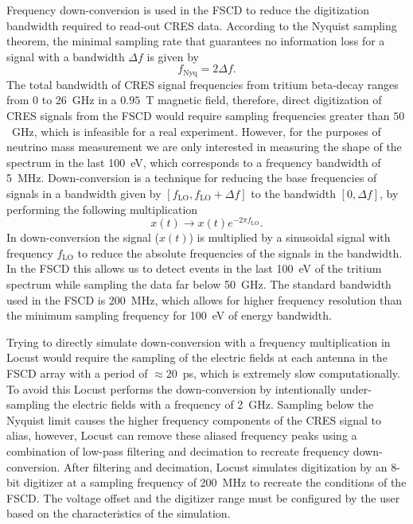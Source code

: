 Frequency down-conversion is used in the FSCD to reduce the digitization bandwidth required to read-out CRES data. According to the Nyquist sampling theorem, the minimal sampling rate that guarantees no information loss for a signal with a bandwidth $\Delta f$ is given by
\begin{equation}
    f_{\textrm{Nyq}}=2\Delta f.
\end{equation}
The total bandwidth of CRES signal frequencies from tritium beta-decay ranges from 0 to 26~GHz in a $0.95$~T magnetic field, therefore, direct digitization of CRES signals from the FSCD would require sampling frequencies greater than $50$~GHz, which is infeasible for a real experiment. However, for the purposes of neutrino mass measurement we are only interested in measuring the shape of the spectrum in the last 100~eV, which corresponds to a frequency bandwidth of 5~MHz. Down-conversion is a technique for reducing the base frequencies of signals in a bandwidth given by $[f_\textrm{LO},f_\textrm{LO}+\Delta f]$ to the bandwidth $[0, \Delta f]$, by performing the following multiplication
\begin{equation}
    x(t)\rightarrow x(t)e^{-2\pi f_\textrm{LO}}.
\end{equation}
In down-conversion the signal ($x(t)$) is multiplied by a sinusoidal signal with frequency $f_\textrm{LO}$ to reduce the absolute frequencies of the signals in the bandwidth. In the FSCD this allows us to detect events in the last 100~eV of the tritium spectrum while sampling the data far below 50~GHz. The standard bandwidth used in the FSCD is 200~MHz, which allows for higher frequency resolution than the minimum sampling frequency for 100~eV of energy bandwidth.

Trying to directly simulate down-conversion with a frequency multiplication in Locust would require the sampling of the electric fields at each antenna in the FSCD array with a period of $\approx20$~ps, which is extremely slow computationally. To avoid this Locust performs the down-conversion by intentionally under-sampling the electric fields with a frequency of 2~GHz. Sampling below the Nyquist limit causes the higher frequency components of the CRES signal to alias, however, Locust can remove these aliased frequency peaks using a combination of low-pass filtering and decimation to recreate frequency down-conversion. After filtering and decimation, Locust simulates digitization by an 8-bit digitizer at a sampling frequency of 200~MHz to recreate the conditions of the FSCD. The voltage offset and the digitizer range must be configured by the user based on the characteristics of the simulation. 

